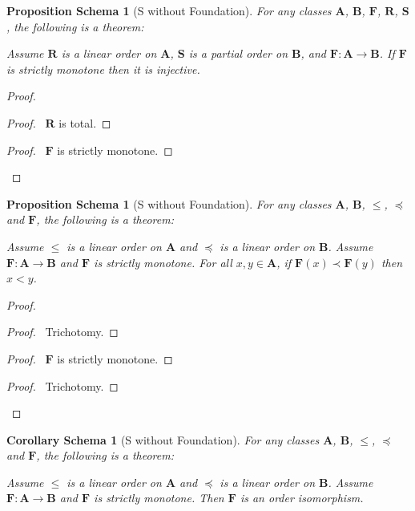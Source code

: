 \documentclass{book}
\let\qed\relax
\newtheorem{props}[ax]{Proposition Schema}
\newtheorem{cors}{Corollary Schema}[ax]
\theoremstyle{definition}
\begin{document}
\begin{props}[S without Foundation]
\label{prop:strictmonotoneinj}
For any classes $\mathbf{A}$, $\mathbf{B}$, $\mathbf{F}$, $\mathbf{R}$, $\mathbf{S}$, the following is a theorem:

Assume $\mathbf{R}$ is a linear order on $\mathbf{A}$, $\mathbf{S}$ is a partial order on $\mathbf{B}$, and $\mathbf{F} : \mathbf{A} \rightarrow \mathbf{B}$. If $\mathbf{F}$ is strictly monotone then it is injective.
\end{props}

\begin{proof}
\pf
{}
\begin{proof}
	\pf\ $\mathbf{R}$ is total.
\end{proof}
\begin{proof}
	\pf\ $\mathbf{F}$ is strictly monotone.
\end{proof}
\qed
\end{proof}

\begin{props}[S without Foundation]
\label{prop:strictmonotoneinv}
For any classes $\mathbf{A}$, $\mathbf{B}$, $\leq$, $\preccurlyeq$ and $\mathbf{F}$, the following is a theorem:

Assume $\leq$ is a linear order on $\mathbf{A}$ and $\preccurlyeq$ is a linear order on $\mathbf{B}$. Assume $\mathbf{F} : \mathbf{A} \rightarrow \mathbf{B}$ and $\mathbf{F}$ is strictly monotone. For all $x,y \in \mathbf{A}$, if $\mathbf{F}(x) \prec \mathbf{F}(y)$ then $x < y$.
\end{props}

\begin{proof}
\pf
{}
\begin{proof}
	\pf\ Trichotomy.
\end{proof}
\begin{proof}
	\pf\ $\mathbf{F}$ is strictly monotone.
\end{proof}
\begin{proof}
	\pf\ Trichotomy.
\end{proof}
\qed
\end{proof}

\begin{cors}[S without Foundation]
\label{cor:orderiso}
For any classes $\mathbf{A}$, $\mathbf{B}$, $\leq$, $\preccurlyeq$ and $\mathbf{F}$, the following is a theorem:

Assume $\leq$ is a linear order on $\mathbf{A}$ and $\preccurlyeq$ is a linear order on $\mathbf{B}$. Assume $\mathbf{F} : \mathbf{A} \rightarrow \mathbf{B}$ and $\mathbf{F}$ is strictly monotone. Then $\mathbf{F}$ is an order isomorphism.
\end{cors}
\end{document}
